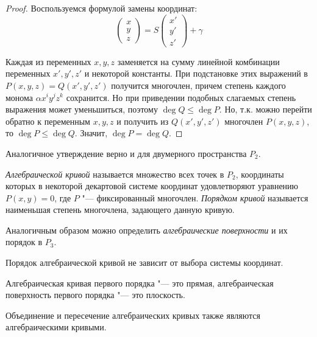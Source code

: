 \begin{proof}
	Воспользуемся формулой замены координат:
	\[\begin{pmatrix}x\\y\\z\end{pmatrix} = S\begin{pmatrix}x'\\y'\\z'\end{pmatrix} + \gamma\]
	
	Каждая из переменных $x, y, z$ заменяется на сумму линейной комбинации переменных $x', y', z'$ и некоторой константы. При подстановке этих выражений в $P(x, y, z) = Q(x', y', z')$ получится многочлен, причем степень каждого монома $\alpha x^iy^jz^k$ сохранится. Но при приведении подобных слагаемых степень выражения может уменьшиться, поэтому $\deg{Q} \le \deg{P}$. Но, т.\:к. можно перейти обратно к переменным $x, y, z$ и получить из $Q(x', y', z')$ многочлен $P(x, y, z)$, то $\deg{P} \le \deg{Q}$. Значит, $\deg{P} = \deg{Q}$.
\end{proof}

\begin{note}
	Аналогичное утверждение верно и для двумерного пространства $P_2$.
\end{note}

\begin{definition}
	\textit{Алгебраической кривой} называется множество всех точек в $P_2$, координаты которых в некоторой декартовой системе координат удовлетворяют уравнению $P(x, y) = 0$, где $P$ "--- фиксированный многочлен. \textit{Порядком кривой} называется наименьшая степень многочлена, задающего данную кривую.
	
	Аналогичным образом можно определить \textit{алгебраические поверхности} и их порядок в $P_3$.
\end{definition}

\begin{note}
	Порядок алгебраической кривой не зависит от выбора системы координат.
\end{note}

\begin{note}
	Алгебраическая кривая первого порядка "--- это прямая, алгебраическая поверхность первого порядка "--- это плоскость.
\end{note}

\begin{proposition}
	Объединение и пересечение алгебраических кривых также являются алгебраическими кривыми.
\end{proposition}

